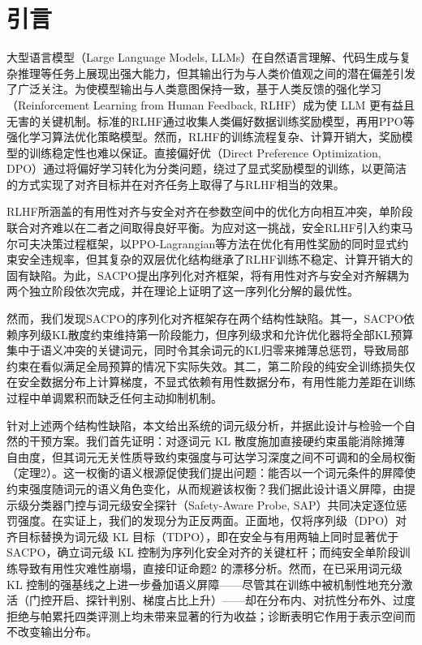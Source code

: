 \documentclass[lettersize,journal]{IEEEtran}
\begin{document}
\section{引言}
大型语言模型（Large Language Models, LLMs）在自然语言理解\cite{bubeck2023paper}、代码生成\cite{chen2021evaluating,gao2023pal}与复杂推理\cite{stiennon2020learning}等任务上展现出强大能力，但其输出行为与人类价值观之间的潜在偏差引发了广泛关注。为使模型输出与人类意图保持一致，基于人类反馈的强化学习（Reinforcement Learning from Human Feedback, RLHF）\cite{ouyang2022training}成为使 LLM 更有益且无害的关键机制。标准的RLHF通过收集人类偏好数据训练奖励模型，再用PPO\cite{schulman2017proximal}等强化学习算法优化策略模型。然而，RLHF的训练流程复杂、计算开销大，奖励模型的训练稳定性也难以保证。直接偏好优（Direct Preference Optimization, DPO）\cite{rafailov2023direct}通过将偏好学习转化为分类问题，绕过了显式奖励模型的训练，以更简洁的方式实现了对齐目标并在对齐任务上取得了与RLHF相当的效果。

RLHF所涵盖的有用性对齐与安全对齐在参数空间中的优化方向相互冲突\cite{bai2022training, ganguli2022red}，单阶段联合对齐难以在二者之间取得良好平衡。为应对这一挑战，安全RLHF\cite{dai2023safe}引入约束马尔可夫决策过程框架，以PPO-Lagrangian\cite{fujimoto2019benchmarking}等方法在优化有用性奖励的同时显式约束安全违规率，但其复杂的双层优化结构继承了RLHF训练不稳定、计算开销大的固有缺陷。为此，SACPO\cite{wachi2024stepwise}提出序列化对齐框架，将有用性对齐与安全对齐解耦为两个独立阶段依次完成，并在理论上证明了这一序列化分解的最优性。

然而，我们发现SACPO的序列化对齐框架存在两个结构性缺陷。其一，SACPO依赖序列级KL散度约束维持第一阶段能力，但序列级求和允许优化器将全部KL预算集中于语义冲突的关键词元，同时令其余词元的KL归零来摊薄总惩罚，导致局部约束在看似满足全局预算的情况下实际失效。其二，第二阶段的纯安全训练损失仅在安全数据分布上计算梯度，不显式依赖有用性数据分布，有用性能力差距在训练过程中单调累积而缺乏任何主动抑制机制。

针对上述两个结构性缺陷，本文给出系统的词元级分析，并据此设计与检验一个自然的干预方案。我们首先证明：对逐词元 KL 散度施加直接硬约束虽能消除摊薄自由度，但其词元无关性质导致约束强度与可达学习深度之间不可调和的全局权衡（定理2）。这一权衡的语义根源促使我们提出问题：能否以一个词元条件的屏障使约束强度随词元的语义角色变化，从而规避该权衡？我们据此设计语义屏障，由提示级分类器门控与词元级安全探针（Safety-Aware Probe, SAP）共同决定逐位惩罚强度。在实证上，我们的发现分为正反两面。正面地，仅将序列级（DPO）对齐目标替换为词元级 KL 目标（TDPO），即在安全与有用两轴上同时显著优于 SACPO，确立词元级 KL 控制为序列化安全对齐的关键杠杆；而纯安全单阶段训练导致有用性灾难性崩塌，直接印证命题2 的漂移分析。然而，在已采用词元级 KL 控制的强基线之上进一步叠加语义屏障——尽管其在训练中被机制性地充分激活（门控开启、探针判别、梯度占比上升）——却在分布内、对抗性分布外、过度拒绝与帕累托四类评测上均未带来显著的行为收益；诊断表明它作用于表示空间而不改变输出分布。
\end{document}
